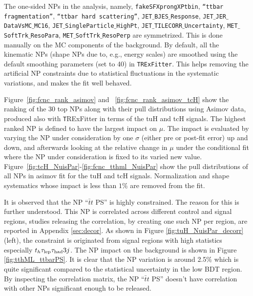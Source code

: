 The one-sided NPs in the analysis, namely, \texttt{fakeSFXprongXPtbin}, \texttt{``ttbar fragmentation''}, \texttt{``ttbar hard scattering''}, \texttt{JET$\_$BJES$\_$Response}, \texttt{JET$\_$JER$\_$DataVsMC$\_$MC16}, \texttt{JET$\_$SingleParticle$\_$HighPt}, \texttt{JET$\_$TILECORR$\_$Uncertainty}, \texttt{MET$\_$SoftTrk$\_$ResoPara}, \texttt{MET$\_$SoftTrk$\_$ResoPerp} are symmetrized. This is done manually on the MC components of the background. By default, all the kinematic NPs (shape NPs due to, e.g., energy scales) are smoothed using the default smoothing parameters (set to 40) in \texttt{TRExFitter}. This helps removing the artificial NP constraints due to statistical fluctuations in the systematic variations, and makes the fit well behaved. %

Figure~\ref{fig:fcnc_rank_asimov} and ~\ref{fig:fcnc_rank_asimov_tcH} show the ranking of the 30 top NPs along with their pull distributions using Asimov data, produced also with {\texttt TRExFitter} in terms of the tuH and tcH signals. The highest ranked NP is defined to have the largest impact on $\mu$. The impact is evaluated by varying the NP under consideration by one $\sigma$ (either pre or post-fit error) up and down, and afterwards looking at the relative change in $\mu$ under the conditional fit where the NP under consideration is fixed to its varied new value.
Figure~\ref{fig:tcH_NuisPar}-\ref{fig:fcnc_tthml_NuisPar} show the pull distributions of all NPs in asimov fit for the tuH and tcH signals. %
Normalization and shape systematics whose impact is less than $1\%$ are removed from the fit. %

It is observed that the NP ``$\bar{t}t$ PS'' is highly constrained. The reason for this is further understood. This NP is correlated across different control and signal regions, studies releasing the correlation, by creating one such NP per region, are reported in Appendix \ref{sec:decor}. As shown  in Figure \ref{fig:tuH_NuisPar_decorr} (left), the constraint is originated from signal regions with high statistics especially $t_h\tau_\text{lep}{}\tau_\text{had} 3j$. The NP impact on the background is shown in Figure \ref{fig:tthML_ttbarPS}. It is clear that the NP variation is around 2.5\% which is quite significant compared to the statistical uncertainty in the low BDT region. By inspecting the correlation matrix, the NP ``$\bar{t}t$ PS'' doesn't have correlation with other NPs significant enough to be released.

